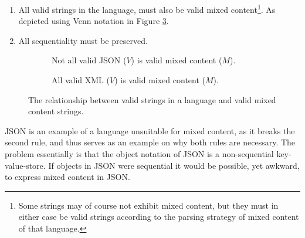 \documentclass{scrreprt}
\begin{document}
\begin{enumerate}
\item All valid strings in the language, must also be valid mixed content\footnote{ Some strings may of course not exhibit mixed content, but they must in either case be valid strings according to the parsing strategy of mixed content of that language.}. As depicted using Venn notation in Figure \ref{fig:mixed-content-venn}.
\item All sequentiality must be preserved.
\end{enumerate}


\begin{figure}[h]
\centering
\begin{subfigure}{.4\textwidth}
  \centering

  \caption{Not all valid JSON ($V$) is valid mixed content ($M$).}
  \label{fig:mixed-content-venn-json}
  
\end{subfigure}%
\begin{subfigure}{.4\textwidth}
  \centering

  \caption{All valid XML ($V$) is valid mixed content ($M$).}
  \label{fig:mixed-content-venn-json}
  
\end{subfigure}
\caption{The relationship between valid strings in a language and valid mixed content strings.}
\label{fig:mixed-content-venn}
\end{figure}



JSON is an example of a language unsuitable for mixed content, as it breaks the second rule, and thus serves as an example on why both rules are necessary. The problem essentially is that the object notation of JSON is a non-sequential key-value-store. If objects in JSON were sequential it would be possible, yet awkward, to express mixed content in JSON.
\end{document}

